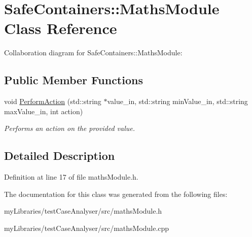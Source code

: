 \hypertarget{classSafeContainers_1_1MathsModule}{}\section{Safe\+Containers\+::Maths\+Module Class Reference}
\label{classSafeContainers_1_1MathsModule}


Collaboration diagram for Safe\+Containers\+::Maths\+Module\+:
\subsection*{Public Member Functions}
\begin{DoxyCompactItemize}
\item 
\mbox{\label{classSafeContainers_1_1MathsModule_a6ab8fa5182f16ccab66729aee89b5242}} 
void \mbox{\hyperlink{classSafeContainers_1_1MathsModule_a6ab8fa5182f16ccab66729aee89b5242}{Perform\+Action}} (std\+::string $\ast$value\+\_\+in, std\+::string min\+Value\+\_\+in, std\+::string max\+Value\+\_\+in, int action)
\begin{DoxyCompactList}\small\item\em Performs an action on the provided value. \end{DoxyCompactList}\end{DoxyCompactItemize}


\subsection{Detailed Description}


Definition at line 17 of file maths\+Module.\+h.



The documentation for this class was generated from the following files\+:\begin{DoxyCompactItemize}
\item 
my\+Libraries/test\+Case\+Analyser/src/maths\+Module.\+h\item 
my\+Libraries/test\+Case\+Analyser/src/maths\+Module.\+cpp\end{DoxyCompactItemize}
